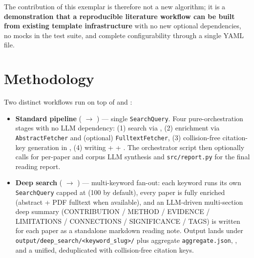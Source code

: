 \documentclass[
]{article}
\providecommand{\tightlist}{%
  \setlength{\itemsep}{0pt}\setlength{\parskip}{0pt}}
\begin{document}
The contribution of this exemplar is therefore not a new algorithm; it
is a \textbf{demonstration that a reproducible literature workflow can
be built from existing template infrastructure} with no new optional
dependencies, no mocks in the test suite, and complete configurability
through a single YAML file.

\newpage

\section{Methodology}\label{sec:methodology}

Two distinct workflows run on top of
 and
:

\begin{itemize}
\tightlist
\item
  \textbf{Standard pipeline} (
  \texorpdfstring{\ensuremath{\to}}{->} ) --- single
  \texttt{SearchQuery}. Four pure-orchestration stages with no LLM
  dependency: (1) search via , (2) enrichment
  via \texttt{AbstractFetcher} and (optional) \texttt{FulltextFetcher},
  (3) collision-free citation-key generation in
  , (4) writing
   +  +
  . The orchestrator script then
  optionally calls  for per-paper and corpus
  LLM synthesis and \texttt{src/report.py} for the final reading report.
\item
  \textbf{Deep search} ( \texorpdfstring{\ensuremath{\to}}{->}
  ) --- multi-keyword
  fan-out: each keyword runs its own \texttt{SearchQuery} capped at
   (100 by default), every paper is
  fully enriched (abstract + PDF fulltext when available), and an
  LLM-driven multi-section deep summary (CONTRIBUTION / METHOD /
  EVIDENCE / LIMITATIONS / CONNECTIONS / SIGNIFICANCE / TAGS) is written
  for each paper as a standalone markdown reading note. Output lands
  under
  \texttt{output/deep\_search/\textless{}keyword\_slug\textgreater{}/}
  plus aggregate \texttt{aggregate.json}, ,
  and a unified, deduplicated 
  with collision-free citation keys.
\end{itemize}
\end{document}

